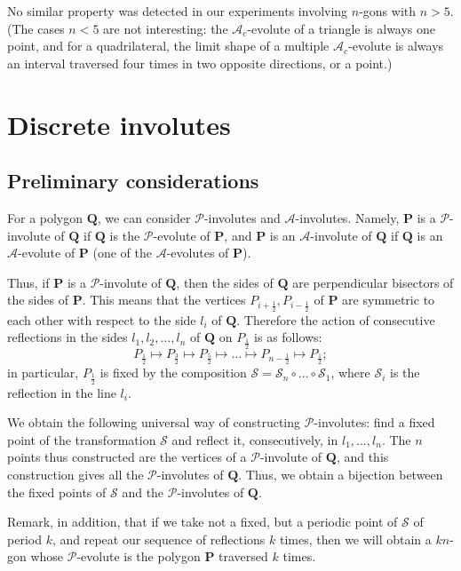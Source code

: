 \documentclass[12pt]{article}
\newcommand{\Pev}{\mathcal{P}}
\newcommand{\Aev}{\mathcal{A}}
\newcommand{\Aec}{\mathcal{A}_c}
\renewcommand{\P}{\mathbf{P}}
\begin{document}
No similar property was detected in our experiments involving $n$-gons with $n>5$. (The cases $n<5$ are not interesting: the $\Aec$-evolute of a triangle is always one point, and for a quadrilateral, the limit shape of a multiple $\Aec$-evolute is always an interval traversed four times in two opposite directions, or a point.)

\section{Discrete involutes} \label{AP-inv}
\subsection{Preliminary considerations}\label{preliminary}
For a polygon $\mathbf Q$, we can consider $\Pev$-involutes and $\Aev$-involutes. Namely, $\P$ is a $\Pev$-involute of $\mathbf Q$ if $\mathbf Q$ is the $\Pev$-evolute of $\P$, and $\P$ is an $\Aev$-involute of $\mathbf Q$ if $\mathbf Q$ is an $\Aev$-evolute of $\P$ (one of the $\Aev$-evolutes of $\P$). 

Thus, if $\P$ is a $\Pev$-involute of $\mathbf Q$, then the sides of $\mathbf Q$ are perpendicular bisectors of the sides of $\P$. This means that the vertices $P_{i+\frac12},P_{i-\frac12}$ of $\P$ are symmetric to each other with respect to the side $l_i$ of $\mathbf Q$. Therefore the action of consecutive reflections in the sides $l_1,l_2,\dots,l_n$ of $\mathbf Q$ on $P_{\frac12}$ is as follows:$$P_{\frac12}\mapsto P_{\frac32}\mapsto P_{\frac52}\mapsto\dots\mapsto P_{n-\frac12}\mapsto P_{\frac12};$$in particular, $P_{\frac12}$ is fixed by the composition ${\mathcal S}={\mathcal S}_n\circ\dots\circ{\mathcal S}_1$, where ${\mathcal S}_i$ is the reflection in the line $l_i$. 

We obtain the following universal way of constructing $\Pev$-involutes: find a fixed point of the transformation $\mathcal S$ and reflect it, consecutively, in $l_1,\dots,l_n$. The $n$ points thus constructed  are the vertices of a $\Pev$-involute of $\mathbf Q$, and this construction gives all the $\Pev$-involutes of $\mathbf Q$. Thus, we obtain a bijection between the fixed points of $\mathcal S$ and the $\Pev$-involutes of $\mathbf Q$. 

Remark, in addition, that if we take not a fixed, but a periodic point of $\mathcal S$ of period $k$, and repeat our sequence of reflections $k$ times, then we will obtain a $kn$-gon whose $\Pev$-evolute is the polygon $\P$ traversed $k$ times. 
\end{document}
